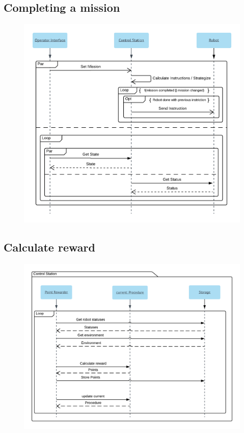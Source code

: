 \subsection{Completing a mission}
\begin{figure}[H]
\includegraphics[width=14cm]{docs/assignments/Assignment_5/diagram2.png}
\end{figure}

\newpage
\subsection{Calculate reward}
\begin{figure}[H]
\includegraphics[width=14cm]{docs/assignments/Assignment_5/diagram3.png}
\end{figure}